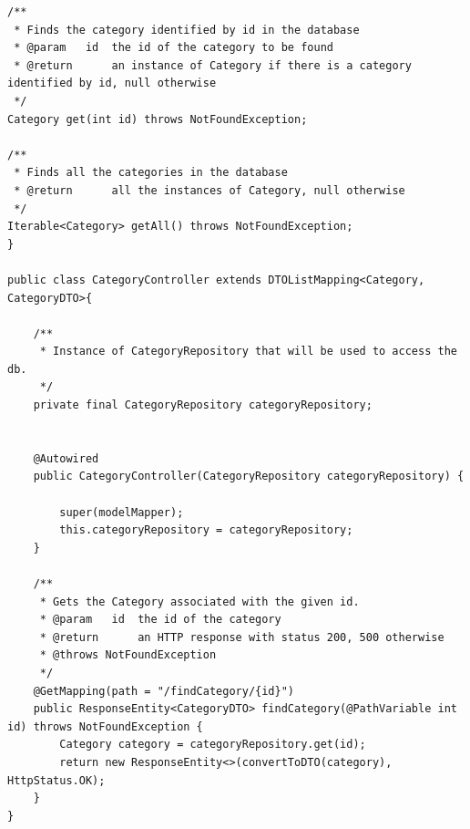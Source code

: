 \documentclass[12pt]{article}
\begin{document}
\begin{itemize}
\begin{itemize}
\begin{lstlisting}
/**
 * Finds the category identified by id in the database
 * @param   id  the id of the category to be found
 * @return      an instance of Category if there is a category identified by id, null otherwise
 */
Category get(int id) throws NotFoundException;

/**
 * Finds all the categories in the database
 * @return      all the instances of Category, null otherwise
 */
Iterable<Category> getAll() throws NotFoundException;
}

public class CategoryController extends DTOListMapping<Category, CategoryDTO>{

    /**
     * Instance of CategoryRepository that will be used to access the db.
     */
    private final CategoryRepository categoryRepository;


    @Autowired
    public CategoryController(CategoryRepository categoryRepository) {

        super(modelMapper);
        this.categoryRepository = categoryRepository;
    }

    /**
     * Gets the Category associated with the given id.
     * @param	id	the id of the category
     * @return		an HTTP response with status 200, 500 otherwise
     * @throws NotFoundException 
     */
    @GetMapping(path = "/findCategory/{id}")
    public ResponseEntity<CategoryDTO> findCategory(@PathVariable int id) throws NotFoundException {
        Category category = categoryRepository.get(id);
        return new ResponseEntity<>(convertToDTO(category), HttpStatus.OK);
    }
}
            \end{lstlisting}
        \end{itemize}
		

\end{itemize}
\end{document}

